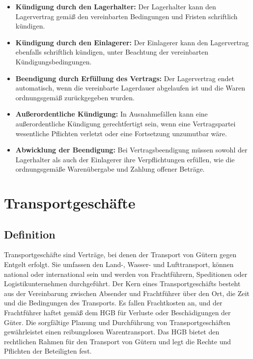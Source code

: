 \begin{itemize}
    \item \textbf{Kündigung durch den Lagerhalter:} Der Lagerhalter kann den Lagervertrag gemäß den vereinbarten Bedingungen und Fristen schriftlich kündigen.
    \item \textbf{Kündigung durch den Einlagerer:} Der Einlagerer kann den Lagervertrag ebenfalls schriftlich kündigen, unter Beachtung der vereinbarten Kündigungsbedingungen.
    \item \textbf{Beendigung durch Erfüllung des Vertrags:} Der Lagervertrag endet automatisch, wenn die vereinbarte Lagerdauer abgelaufen ist und die Waren ordnungsgemäß zurückgegeben wurden.
    \item \textbf{Außerordentliche Kündigung:} In Ausnahmefällen kann eine außerordentliche Kündigung gerechtfertigt sein, wenn eine Vertragspartei wesentliche Pflichten verletzt oder eine Fortsetzung unzumutbar wäre.
    \item \textbf{Abwicklung der Beendigung:} Bei Vertragsbeendigung müssen sowohl der Lagerhalter als auch der Einlagerer ihre Verpflichtungen erfüllen, wie die ordnungsgemäße Warenübergabe und Zahlung offener Beträge.
\end{itemize}





\chapter[Transportgeschäfte]{Transportgeschäfte}

\section{Definition}

Transportgeschäfte sind Verträge, bei denen der Transport von Gütern gegen Entgelt erfolgt. Sie umfassen den Land-, Wasser- und Lufttransport, können national oder international sein und werden von Frachtführern, Speditionen oder Logistikunternehmen durchgeführt. Der Kern eines Transportgeschäfts besteht aus der Vereinbarung zwischen Absender und Frachtführer über den Ort, die Zeit und die Bedingungen des Transports. Es fallen Frachtkosten an, und der Frachtführer haftet gemäß dem HGB für Verluste oder Beschädigungen der Güter. Die sorgfältige Planung und Durchführung von Transportgeschäften gewährleistet einen reibungslosen Warentransport. Das HGB bietet den rechtlichen Rahmen für den Transport von Gütern und legt die Rechte und Pflichten der Beteiligten fest.


